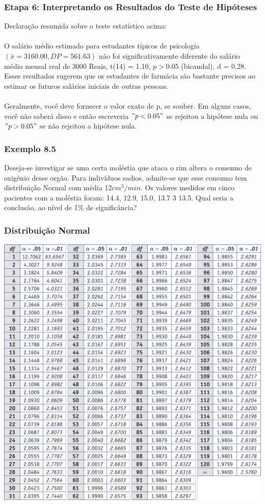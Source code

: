 \documentclass[11pt]{beamer}
\begin{document}
\begin{frame}
\frametitle{Etapa 6: Interpretando os Resultados do Teste de Hipóteses}

Declaração resumida sobre o teste estatístico acima:\\~\\

O salário médio estimado para estudantes típicos de psicologia $(\bar{x} = 3160.00, DP = 561.63)$ não foi significativamente diferente do salário médio mensal real de 3000 Reais, t(14) = 1.10, $p > 0.05$ (bicaudal), d = 0.28. Esses resultados sugerem que os estudantes de farmácia são bastante precisos ao estimar os futuros salários iniciais de outras pessoas.\\~\\

Geralmente, você deve fornecer o valor exato de p, se souber. Em alguns casos, você não saberá disso e então escreveria \("p < 0.05"\) se rejeitou a hipótese nula ou \("p > 0.05"\) se não rejeitou a hipótese nula.
\end{frame}

\begin{frame}
\frametitle{Exemplo 8.5}
Deseja-se investigar se uma certa moléstia que ataca o rim altera o consumo de oxigênio desse orgão. Para indivíduos sadios, admite-se que esse consumo tem distribuição Normal com média 12\(cm^3/min\). Os valores medidos em cinco pacientes com a moléstia foram: 14.4, 12.9, 15.0, 13.7 3 13.5. Qual seria a conclusão, ao nível de 1\% de significância?
\vspace{1in}
\vspace{1in}

\end{frame}

\begin{frame}
\frametitle{Distribuição Normal}

\begin{center}\includegraphics[width=0.7\linewidth]{figs/tabela_t} \end{center}
\end{frame}
\end{document}
